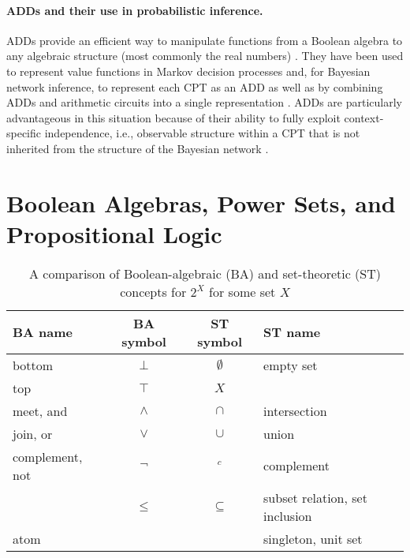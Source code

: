 \documentclass{article}
\theoremstyle{definition}
\theoremstyle{remark}
\begin{document}
\paragraph{ADDs and their use in probabilistic inference.} ADDs provide an
efficient way to manipulate functions from a Boolean algebra to any algebraic
structure (most commonly the real numbers)
\cite{DBLP:journals/fmsd/BaharFGHMPS97}. They have been used to represent value
functions in Markov decision processes \cite{DBLP:conf/uai/HoeySHB99} and, for
Bayesian network inference, to represent each CPT as an ADD
\cite{DBLP:conf/icml/ZhaoMP15} as well as by combining ADDs and arithmetic
circuits into a  single representation \cite{DBLP:conf/ijcai/ChaviraD07}. ADDs
are particularly advantageous in this situation because of their ability to
fully exploit context-specific independence, i.e., observable structure within a
CPT that is not inherited from the structure of the Bayesian network
\cite{DBLP:conf/uai/BoutilierFGK96}.

\section{Boolean Algebras, Power Sets, and Propositional
  Logic} \label{sec:prelims}

\begin{table}
  \centering
  \caption{A comparison of Boolean-algebraic (BA) and set-theoretic (ST)
    concepts for $2^X$ for some set $X$}
  \label{tbl:notation}
  \begin{tabular}{lccl}
    \toprule
    BA name & BA symbol & ST symbol & ST name \\
    \midrule
    bottom & $\bot$ & $\emptyset$ & empty set \\
    top & $\top$ & $X$ & \\
    meet, and & $\land$ & $\cap$ & intersection \\
    join, or & $\lor$ & $\cup$ & union \\
    complement, not & $\neg$ & $^c$ & complement \\
            & $\le$ & $\subseteq$ & subset relation, set inclusion \\
    atom & & & singleton, unit set \\
    \bottomrule
  \end{tabular}
\end{table}
\end{document}
